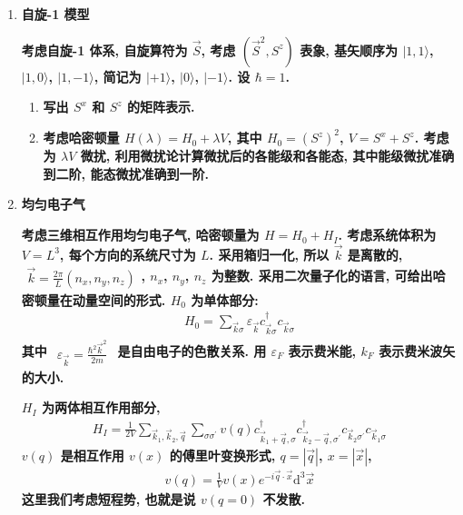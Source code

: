 \documentclass[../../main.tex]{subfiles}
\begin{document}
\begin{enumerate}
  \item \textbf{自旋-1 模型}
  
\textbf{  考虑自旋-1 体系, 自旋算符为 $\vec{S}$, 考虑 $(\vec{S}^{2},S^{z})$ 表象, 基矢顺序为 $|1,1\rangle$, $|1,0\rangle$, $|1,-1\rangle$, 简记为 $|+1\rangle$, $|0\rangle$, $|-1\rangle$. 设 $\hbar = 1$. }
  \begin{enumerate}
    \item \textbf{写出 $S^{x}$ 和 $S^{z}$ 的矩阵表示.}
    \item \textbf{考虑哈密顿量 $H(\lambda) = H_{0} + \lambda V$, 其中 $H_{0} = (S^{z})^{2}$, $V = S^{x} + S^{z}$. 考虑为 $\lambda V$ 微扰, 利用微扰论计算微扰后的各能级和各能态, 其中能级微扰准确到二阶, 能态微扰准确到一阶. }
  \end{enumerate}

  \item \textbf{均匀电子气}
  

\textbf{考虑三维相互作用均匀电子气, 哈密顿量为 $H = H_{0} + H_{I}$. 考虑系统体积为 $V = L^{3}$, 每个方向的系统尺寸为 $L$. 采用箱归一化, 所以 $\vec{k}$ 是离散的, $\begin{aligned}\vec{k} = \frac{2\pi}{L}(n_{x},n_{y},n_{z})\end{aligned}$, $n_{x}$, $n_{y}$, $n_{z}$ 为整数. 采用二次量子化的语言, 可给出哈密顿量在动量空间的形式. $H_{0}$ 为单体部分:}
  \begin{align*}
    H_{0} = \sum_{\vec{k}\sigma}\varepsilon_{\vec{k}}c_{\vec{k}\sigma}^{\dagger}c_{\vec{k}\sigma}
  \end{align*}
\textbf{其中 $\begin{aligned}\varepsilon_{\vec{k}} = \frac{\hbar^{2}\vec{k}^{2}}{2m}\end{aligned}$ 是自由电子的色散关系. 用 $\varepsilon_{F}$ 表示费米能, $k_{F}$ 表示费米波矢的大小.}

  \textbf{$H_{I}$ 为两体相互作用部分,
  \begin{align*}
    H_{I} = \frac{1}{2V}\sum_{\vec{k}_{1},\vec{k}_{2},\vec{q}}\sum_{\sigma\sigma^{\prime}}v(q)c_{\vec{k}_{1}+\vec{q},\sigma}^{\dagger}c_{\vec{k}_{2}-\vec{q},\sigma^{\prime}}^{\dagger}c_{\vec{k}_{2}\sigma^{\prime}}c_{\vec{k}_{1}\sigma}
  \end{align*}
  $v(q)$ 是相互作用 $v(x)$ 的傅里叶变换形式, $q = |\vec{q}|$, $x = |\vec{x}|$,
  \begin{align*}
    v(q) = \frac{1}{V}v(x)e^{-i\vec{q}\cdot\vec{x}}\mathrm{d}^{3}\vec{x}
  \end{align*}
  这里我们考虑短程势, 也就是说 $v(q=0)$ 不发散.}


\end{enumerate}
\end{document}

